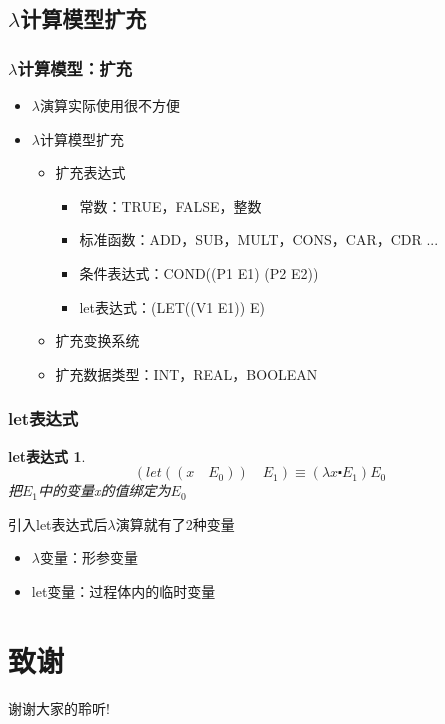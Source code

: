 \documentclass[CJK,compress,hyperref]{beamer}
\begin{document}
\begin{CJK}{UTF8}{song}
\subsection{$\lambda$计算模型扩充}
\begin{frame}
  \frametitle{$\lambda$计算模型：扩充}
  \begin{itemize}
  \item $\lambda$演算实际使用很不方便 
  \item $\lambda$计算模型扩充
    \begin{itemize}
    \item 扩充表达式
      \begin{itemize}
      \item 常数：TRUE，FALSE，整数
      \item 标准函数：ADD，SUB，MULT，CONS，CAR，CDR ...
      \item 条件表达式：COND((P1 E1) (P2 E2)) 
      \item let表达式：(LET((V1 E1)) E) 
      \end{itemize}
    \item 扩充变换系统 
    \item 扩充数据类型：INT，REAL，BOOLEAN
    \end{itemize}
  \end{itemize}
\end{frame}

\begin{frame}
  \frametitle{let表达式} 
  \newtheorem{letE}{let表达式} 
  \begin{letE}
    \begin{displaymath}
      (let ((x \quad E_0)) \quad E_1) \equiv (\lambda x \centerdot E_1) E_0  
    \end{displaymath} 
    把$E_1$中的变量x的值绑定为$E_0$
  \end{letE}
  引入let表达式后$\lambda$演算就有了2种变量 
  \begin{itemize}
  \item $\lambda$变量：形参变量 
  \item let变量：过程体内的临时变量
  \end{itemize}
\end{frame} 

\section{致谢}
\begin{frame}
  \begin{Huge}
    \begin{center}
      谢谢大家的聆听!
    \end{center}
  \end{Huge}
\end{frame}
 
\newpage
\end{CJK}
\end{document}
